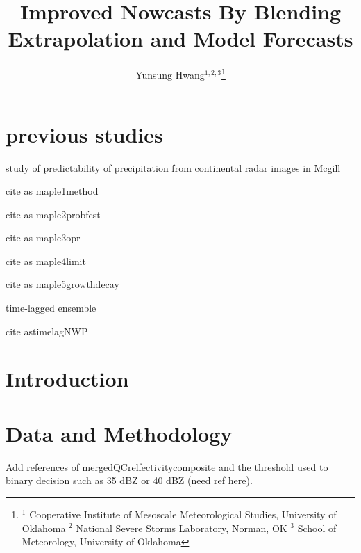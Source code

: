 \documentclass[12pt]{article}
\begin{document}
\title{Improved Nowcasts By Blending Extrapolation and Model Forecasts}

\author{Yunsung Hwang$^{1, 2, 3}$\thanks{$^1$ Cooperative Institute of Mesoscale Meteorological Studies, University of Oklahoma $^2$ National Severe Storms Laboratory, Norman, OK  $^3$ School of Meteorology, University of Oklahoma}}

\amstitle
%

\section{previous studies}

{\color{blue}study of predictability of precipitation from continental radar images in Mcgill}

cite as {maple1method} \citep{maple1method}

cite as {maple2probfcst} \citep{maple2probfcst}

cite as {maple3opr} \citep{maple3opr}

cite as {maple4limit} \citep{maple4limit}

cite as {maple5growthdecay} \citep{maple5growthdecay}






{\color{blue}time-lagged ensemble}

cite as{timelagNWP} \citep{timelagNWP}


\section{Introduction}
 
\section{Data and Methodology}
Add references of mergedQCrelfectivitycomposite and the threshold used to binary decision such as 35 dBZ or 40 dBZ (need ref here).
\end{document}
